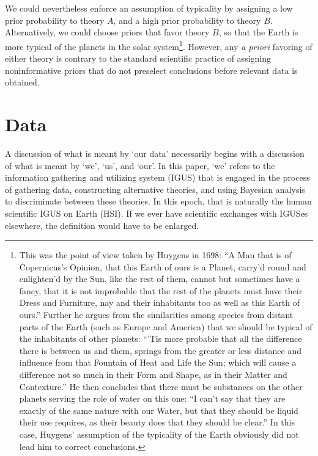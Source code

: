 \documentclass[pra,twocolumn,nofootinbib,eqsecnum,floatfix]{revtex4}
\begin{document}
We could nevertheless enforce an assumption of typicality by assigning a low prior probability to 
theory $A$, and a high prior probability to theory $B$.  Alternatively, we could choose priors that favor theory $B$, so that the Earth is more typical of the planets in the solar system\footnote{
This was the point of view taken by  Huygens \cite{Huy1698} in 1698:
``A Man that is of Copernicus's Opinion, that this Earth of ours is a Planet, carry'd round and enlighten'd by the Sun, like the rest of them, cannot but sometimes have a fancy, that it is not improbable that the rest of the planets must have their Dress and Furniture, nay and their inhabitants too as well as this Earth of ours.''  Further he argues from the similarities among species from distant parts of the Earth (such as Europe and America) that we should be typical of the inhabitants of other planets: ``'Tis more probable that all the difference there is between us and them, springs from the greater or less distance and influence from that Fountain of Heat and Life the Sun; which will cause a difference not so much in their Form and Shape, as in their Matter and Contexture.''  He then concludes that there must be 
substances on the other planets serving the role of water on this one: ``I can't say that they are exactly of the same nature with our Water, but that they should be liquid their use requires, as their beauty does that they should be clear.''  In this case, Huygens' assumption of the typicality of the Earth obviously did not lead him to correct conclusions.}.  
However, any {\it a priori\/} favoring of either theory is contrary to the standard 
scientific practice of assigning noninformative priors that do not preselect conclusions before relevant data is obtained.

\section{Data}  
\label{Data}

A discussion of what is meant by `our data' necessarily begins with a discussion of what is meant by `we', `us', and `our'. In this paper, `we' refers to the information gathering and utilizing system (IGUS) that is engaged in the process of gathering data, constructing alternative theories, and using Bayesian analysis to discriminate between these theories. In this epoch, that is naturally the human scientific IGUS on Earth (HSI). If we ever have scientific exchanges with IGUSes 
elsewhere, the definition would have to be enlarged. 
\end{document}
